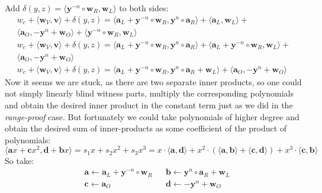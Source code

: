 \documentclass[../lecture-notes-148x210.tex]{subfiles}
\begin{document}
Add $\delta(y, z) = \langle \mathbf{y}^{-n} \circ \mathbf{w}_R, \mathbf{w}_L \rangle $ to both sides:
$$
\begin{aligned}
w_c + \langle \mathbf{w}_V, \mathbf{v} \rangle +
\delta(y, z) = \langle \mathbf{a}_L + \mathbf{y}^{-n} \circ \mathbf{w}_R, \mathbf{y}^n \circ \mathbf{a}_R \rangle + \langle \mathbf{a}_L, \mathbf{w}_L \rangle +\\
\langle \mathbf{a}_O, -\mathbf{y}^n + \mathbf{w}_O \rangle + 
\langle \mathbf{y}^{-n} \circ \mathbf{w}_R, \mathbf{w}_L \rangle\\
w_c + \langle \mathbf{w}_V, \mathbf{v} \rangle + \delta(y, z)
    = \langle \mathbf{a}_L + \mathbf{y}^{-n} \circ \mathbf{w}_R, 
    \mathbf{y}^n \circ \mathbf{a}_R \rangle + 
    \langle \mathbf{a}_L + \mathbf{y}^{-n} \circ \mathbf{w}_R,
    \mathbf{w}_L \rangle + \\
    \langle \mathbf{a}_O, 
    -\mathbf{y}^n + \mathbf{w}_O \rangle \\
    w_c + \langle \mathbf{w}_V, \mathbf{v} \rangle + \delta(y, z) =
\langle \mathbf{a}_L + \mathbf{y}^{-n} \circ \mathbf{w}_R, \mathbf{y}^n \circ \mathbf{a}_R + \mathbf{w}_L \rangle + \langle \mathbf{a}_O, -\mathbf{y}^n + \mathbf{w}_O \rangle
\end{aligned}
$$
Now it seems we are stuck, as there are two separate inner products, so one could not simply linearly blind witness parts, multiply the corresponding polynomials and obtain the desired inner product in the constant term just as we did in the \textit{range-proof} case. But fortunately we could take polynomials of higher degree and obtain the desired sum of inner-products as some coefficient of the product of polynomials:
\begin{equation}
    \langle \mathbf{a}x + \mathbf{c}x^2, \mathbf{d} + \mathbf{b}x \rangle = s_1x + s_2x^2 + s_3x^3 = x \cdot \langle \mathbf{a}, \mathbf{d} \rangle + x^2 \cdot (\langle \mathbf{a}, \mathbf{b} \rangle + \langle \mathbf{c}, \mathbf{d} \rangle) + x^3 \cdot \langle \mathbf{c}, \mathbf{b} \rangle
    \label{eq:inner-product-circuit-1}
\end{equation}
So take:
\begin{equation}
    \begin{aligned}
    &\mathbf{a} \gets \mathbf{a}_L + \mathbf{y}^{-n} \circ \mathbf{w}_R &&\mathbf{b} \gets \mathbf{y}^n \circ \mathbf{a}_R + \mathbf{w}_L \\
    &\mathbf{c} \gets \mathbf{a}_O &&\mathbf{d} \gets -\mathbf{y}^n + \mathbf{w}_O
    \end{aligned}
    \label{eq:inner-product-circuit-assignment}
\end{equation}
\end{document}
